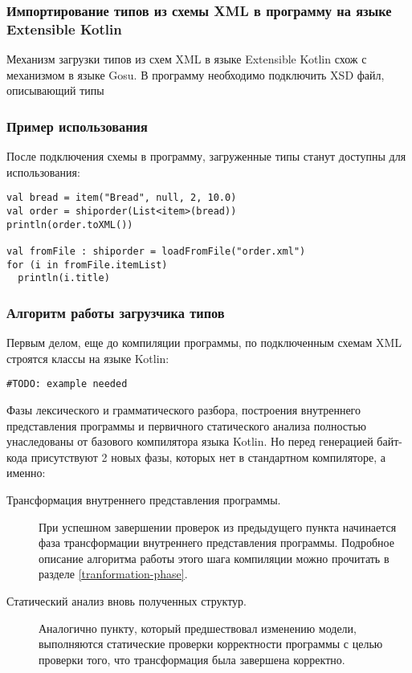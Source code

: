 \subsubsection{Импортирование типов из схемы XML в программу на языке Extensible Kotlin}
Механизм загрузки типов из схем XML в языке Extensible Kotlin схож с механизмом в языке Gosu\td.
В программу необходимо подключить XSD файл, описывающий типы 
\td

\subsubsection{Пример использования}
После подключения схемы в программу, загруженные типы станут доступны для использования: \td

\begin{lstlisting}
val bread = item("Bread", null, 2, 10.0)
val order = shiporder(List<item>(bread))
println(order.toXML())

val fromFile : shiporder = loadFromFile("order.xml")
for (i in fromFile.itemList)
  println(i.title)
\end{lstlisting}

\subsubsection{Алгоритм работы загрузчика типов}

\td Первым делом, еще до компиляции программы, по подключенным схемам XML строятся классы на языке Kotlin:

\begin{lstlisting}
#TODO: example needed
\end{lstlisting}

Фазы лексического и грамматического разбора, построения внутреннего представления программы и первичного статического анализа полностью унаследованы от базового компилятора языка Kotlin. Но перед генерацией байт-кода присутствуют 2 новых фазы, которых нет в стандартном компиляторе, а именно:

\begin{description}
\item[Трансформация внутреннего представления программы.] При успешном завершении проверок из предыдущего пункта начинается фаза трансформации внутреннего представления программы. Подробное описание алгоритма работы этого шага компиляции можно прочитать в разделе \ref{tranformation-phase}.
\item[Статический анализ вновь полученных структур.]
Аналогично пункту, который предшествовал изменению модели, выполняются статические проверки корректности программы с целью проверки того, что трансформация была завершена корректно.
\end{description}

